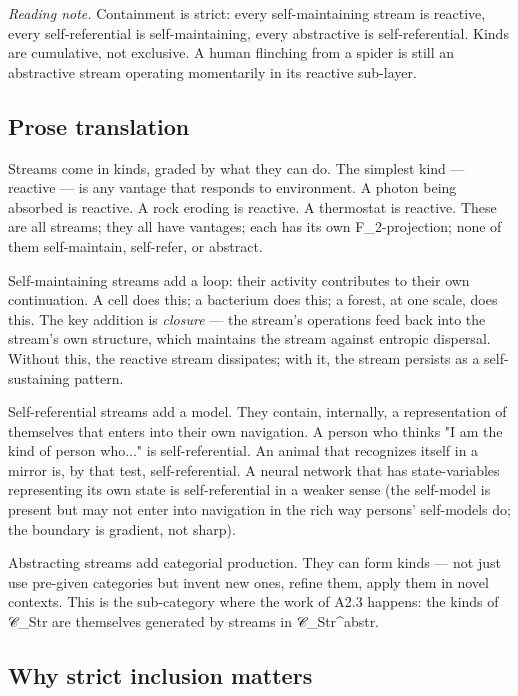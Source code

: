 \documentclass[11pt, openany]{book}
\begin{document}
\textit{Reading note.} Containment is strict: every self-maintaining stream is reactive, every self-referential is self-maintaining, every abstractive is self-referential. Kinds are cumulative, not exclusive. A human flinching from a spider is still an abstractive stream operating momentarily in its reactive sub-layer.

\subsection{Prose translation}

Streams come in kinds, graded by what they can do. The simplest kind --- reactive --- is any vantage that responds to environment. A photon being absorbed is reactive. A rock eroding is reactive. A thermostat is reactive. These are all streams; they all have vantages; each has its own F\_\allowbreak{}2-projection; none of them self-maintain, self-refer, or abstract.

Self-maintaining streams add a loop: their activity contributes to their own continuation. A cell does this; a bacterium does this; a forest, at one scale, does this. The key addition is \textit{closure} --- the stream's operations feed back into the stream's own structure, which maintains the stream against entropic dispersal. Without this, the reactive stream dissipates; with it, the stream persists as a self-sustaining pattern.

Self-referential streams add a model. They contain, internally, a representation of themselves that enters into their own navigation. A person who thinks "I am the kind of person who..." is self-referential. An animal that recognizes itself in a mirror is, by that test, self-referential. A neural network that has state-variables representing its own state is self-referential in a weaker sense (the self-model is present but may not enter into navigation in the rich way persons' self-models do; the boundary is gradient, not sharp).

Abstracting streams add categorial production. They can form kinds --- not just use pre-given categories but invent new ones, refine them, apply them in novel contexts. This is the sub-category where the work of A2.3 happens: the kinds of 𝒞\_\allowbreak{}Str are themselves generated by streams in 𝒞\_\allowbreak{}Str\textasciicircum{}abstr.

\subsection{Why strict inclusion matters}
\end{document}
